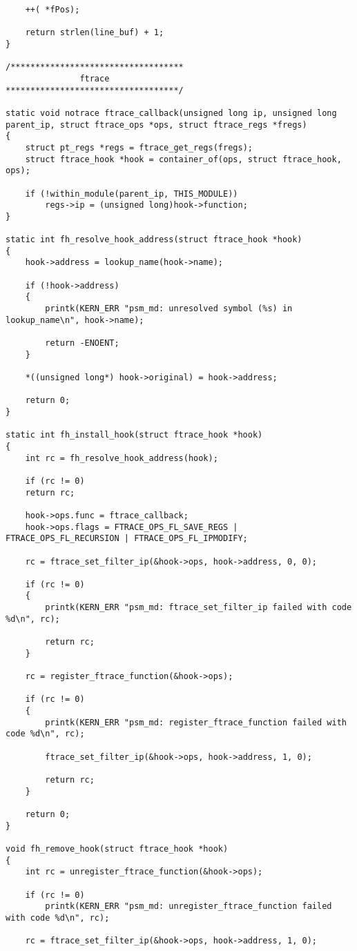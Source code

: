\begin{lstlisting}
	++( *fPos);
	
	return strlen(line_buf) + 1;
}

/***********************************
               ftrace
***********************************/

static void notrace ftrace_callback(unsigned long ip, unsigned long parent_ip, struct ftrace_ops *ops, struct ftrace_regs *fregs)
{
	struct pt_regs *regs = ftrace_get_regs(fregs);
	struct ftrace_hook *hook = container_of(ops, struct ftrace_hook, ops);
	
	if (!within_module(parent_ip, THIS_MODULE))
		regs->ip = (unsigned long)hook->function;
}

static int fh_resolve_hook_address(struct ftrace_hook *hook)
{
	hook->address = lookup_name(hook->name);
	
	if (!hook->address)
	{
		printk(KERN_ERR "psm_md: unresolved symbol (%s) in lookup_name\n", hook->name);
		
		return -ENOENT;
	}
	
	*((unsigned long*) hook->original) = hook->address;
	
	return 0;
}

static int fh_install_hook(struct ftrace_hook *hook)
{
	int rc = fh_resolve_hook_address(hook);
	
	if (rc != 0)
	return rc;
	
	hook->ops.func = ftrace_callback;
	hook->ops.flags = FTRACE_OPS_FL_SAVE_REGS | FTRACE_OPS_FL_RECURSION | FTRACE_OPS_FL_IPMODIFY;
	
	rc = ftrace_set_filter_ip(&hook->ops, hook->address, 0, 0);
	
	if (rc != 0)
	{
		printk(KERN_ERR "psm_md: ftrace_set_filter_ip failed with code %d\n", rc);
		
		return rc;
	}
	
	rc = register_ftrace_function(&hook->ops);
	
	if (rc != 0)
	{
		printk(KERN_ERR "psm_md: register_ftrace_function failed with code %d\n", rc);
		
		ftrace_set_filter_ip(&hook->ops, hook->address, 1, 0);
		
		return rc;
	}
	
	return 0;
}

void fh_remove_hook(struct ftrace_hook *hook)
{
	int rc = unregister_ftrace_function(&hook->ops);
	
	if (rc != 0)
		printk(KERN_ERR "psm_md: unregister_ftrace_function failed with code %d\n", rc);
	
	rc = ftrace_set_filter_ip(&hook->ops, hook->address, 1, 0);
	

\end{lstlisting}
